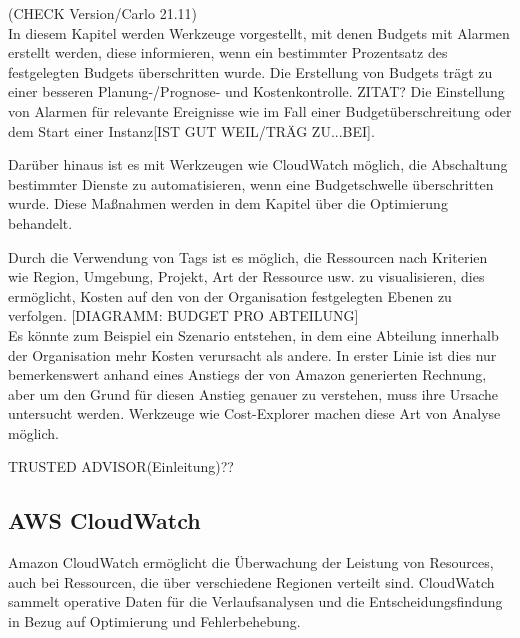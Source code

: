 (CHECK Version/Carlo 21.11)\\
In diesem Kapitel werden Werkzeuge vorgestellt, mit denen Budgets mit Alarmen erstellt werden, diese informieren, wenn ein bestimmter Prozentsatz des festgelegten Budgets überschritten wurde. Die Erstellung von Budgets trägt zu einer besseren Planung-/Prognose- und Kostenkontrolle. ZITAT?
Die Einstellung von Alarmen für relevante Ereignisse wie im Fall einer Budgetüberschreitung oder dem Start einer Instanz[IST GUT WEIL/TRÄG ZU...BEI].

Darüber hinaus ist es mit Werkzeugen wie CloudWatch möglich, die Abschaltung bestimmter Dienste zu automatisieren, wenn eine Budgetschwelle überschritten wurde. Diese Maßnahmen werden in dem Kapitel über die Optimierung behandelt.

Durch die Verwendung von Tags ist es möglich, die Ressourcen nach Kriterien wie Region, Umgebung, Projekt, Art der Ressource usw. zu visualisieren, dies %
ermöglicht, Kosten auf den von der Organisation festgelegten Ebenen zu verfolgen. 
[DIAGRAMM: BUDGET PRO ABTEILUNG]\\
Es könnte zum Beispiel ein Szenario entstehen, in dem eine Abteilung innerhalb der Organisation mehr Kosten verursacht als andere. In erster Linie ist dies nur bemerkenswert anhand eines Anstiegs der von Amazon generierten Rechnung, aber um den Grund für diesen Anstieg genauer zu verstehen, muss ihre Ursache untersucht werden. Werkzeuge wie Cost-Explorer machen diese Art von Analyse möglich.

TRUSTED ADVISOR(Einleitung)??

\subsection{AWS CloudWatch}

Amazon CloudWatch ermöglicht die Überwachung der Leistung von Resources, auch bei Ressourcen, die über verschiedene Regionen verteilt sind.
CloudWatch sammelt operative Daten für die Verlaufsanalysen und die Entscheidungsfindung in Bezug auf Optimierung und Fehlerbehebung.

